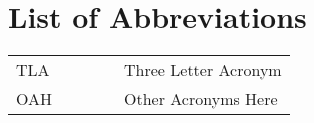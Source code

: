 \chapter*{List of Abbreviations}
\begin{center}
  \begin{longtable}{lll}
    TLA  & ~~~~~ & Three Letter Acronym \\
    OAH  & ~~~~~ & Other Acronyms Here \\
  \end{longtable}
\end{center}